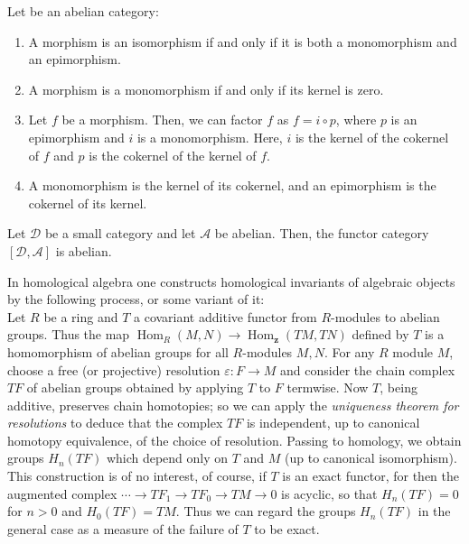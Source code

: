 \begin{theo} Let \ca be an abelian category:
\begin{enumerate}
    \item A morphism is an isomorphism if and only if it is both a monomorphism and an epimorphism.
    \item A morphism is a monomorphism if and only if its kernel is zero.
    \item Let $f$ be a morphism. Then, we can factor $f$ as $f=i \circ p$, where $p$ is an epimorphism and $i$ is a monomorphism. Here, $i$ is the kernel of the cokernel of $f$ and $p$ is the cokernel of the kernel of $f$.
    \item A monomorphism is the kernel of its cokernel, and an epimorphism is the cokernel of its kernel.
\end{enumerate}   
\end{theo}

\begin{prop}
Let $\mathcal{D}$ be a small category and let $\mathcal{A}$ be abelian. Then, the functor category $[\mathcal{D}, \mathcal{A}]$ is abelian.   
\end{prop}

In homological algebra one constructs homological invariants of algebraic objects by the following process, or some variant of it:\\
Let $R$ be a ring and $T$ a covariant additive functor from $R$-modules to abelian groups. Thus the map $\operatorname{Hom}_R(M, N) \rightarrow \operatorname{Hom}_{\mathbf{z}}(T M, T N)$ defined by $T$ is a homomorphism of abelian groups for all $R$-modules $M, N$. For any $R$ module $M$, choose a free (or projective) resolution $\varepsilon: F \rightarrow M$ and consider the chain complex $T F$ of abelian groups obtained by applying $T$ to $F$ termwise. Now $T$, being additive, preserves chain homotopies; so we can apply the \textit{uniqueness theorem for resolutions} to deduce that the complex $T F$ is independent, up to canonical homotopy equivalence, of the choice of resolution. Passing to homology, we obtain groups $H_n(T F)$ which depend only on $T$ and $M$ (up to canonical isomorphism).\\
This construction is of no interest, of course, if $T$ is an exact functor, for then the augmented complex
$
\cdots \rightarrow T F_1 \rightarrow T F_0 \rightarrow T M \rightarrow 0
$
is acyclic, so that $H_n(T F)=0$ for $n>0$ and $H_0(T F)=T M$. Thus we can regard the groups $H_n(T F)$ in the general case as a measure of the failure of $T$ to be exact.

